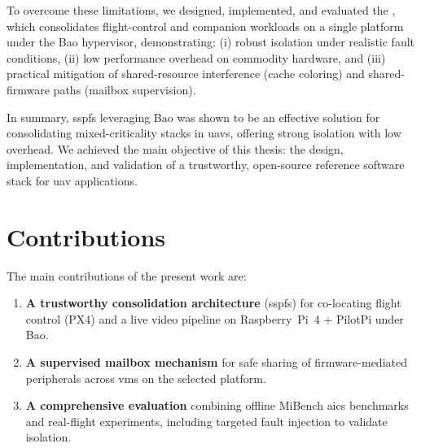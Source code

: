 To overcome these limitations, we designed, implemented, and evaluated the
, which consolidates flight-control and companion workloads on
a single platform under the Bao hypervisor, demonstrating:
(i) robust isolation under realistic fault conditions,
(ii) low performance overhead on commodity hardware, and
(iii) practical mitigation of shared-resource interference (cache coloring) and
shared-firmware paths (mailbox supervision).

In summary, \gls{sspfs} leveraging Bao was shown to be an effective solution for
consolidating mixed-criticality stacks in \glspl{uav}, offering strong isolation
with low overhead. We achieved the main objective of this thesis: the design,
implementation, and validation of a trustworthy, open-source reference software
stack for \gls{uav} applications.

\section{Contributions}
The main contributions of the present work are:
\begin{enumerate}
  \item \textbf{A trustworthy consolidation architecture} (\gls{sspfs}) for co-locating flight control (PX4) and a live video pipeline on Raspberry~Pi~4 + PilotPi under Bao.
  \item \textbf{A supervised mailbox mechanism} for safe sharing of
    firmware-mediated peripherals across \glspl{vm} on the selected platform.
  \item \textbf{A comprehensive evaluation} combining offline MiBench \gls{aics} benchmarks and real-flight experiments, including targeted fault injection to validate isolation.
\end{enumerate}

